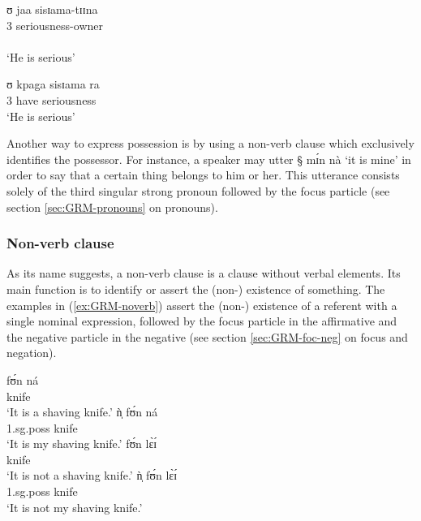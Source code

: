 \begin{exe}
\ex\label{ex:GRM-poss-owner}
\begin{xlist}
 \ex\label{ex:GRM-poss-owner-exist}
\glll ʊ jaa sisɪama-tɪɪna\\
{3\sg} {\ident} seriousness-owner\\
  {\psor} {}   {\psed} \\
\glt `He is serious'

 \ex\label{ex:GRM-poss-owner-have}
\gll ʊ kpaga sisɪama ra\\
{3\sg} have {seriousness} {\foc}\\
\glt `He is serious'
\end{xlist}
\end{exe}

Another way to express possession is by using a non-verb clause which
  exclusively identifies   the possessor. For instance, a speaker may utter {\S
mɪ́n nà} `it is
mine' in order to say that a
certain thing belongs to him or her. This utterance consists solely of the third
singular strong pronoun followed by
the focus particle (see section \ref{sec:GRM-pronouns} on pronouns).


\subsubsection{Non-verb clause}
\label{sec:GRM-noverb}

As its name suggests, a non-verb clause is a clause without verbal elements. 
Its
main function is to identify or assert the (non-) existence of 
something.  The examples in (\ref{ex:GRM-noverb}) assert the (non-) existence
of a
referent with a single nominal expression, followed by the focus particle in
the affirmative and the negative particle in the negative (see section
\ref{sec:GRM-foc-neg} on focus and negation). 



\begin{exe}
\ex\label{ex:GRM-noverb}

\begin{xlist}
\begin{multicols}{2}
 \ex\label{ex:GRM-noverb-aff-1}
\gll fʊ́n ná\\
knife {\foc}\\
\glt `It is a shaving knife.'
 \ex\label{ex:GRM-noverb-aff-poss}
\gll ǹ̩ fʊ́n ná\\
{\sc 1.sg.poss} knife {\foc}\\
 \glt `It is my shaving knife.'
 \ex\label{ex:GRM-noverb-neg-1}
\gll fʊ́n lɛ̀ɪ́\\
knife {\neg}\\
 \glt `It is not a shaving knife.'
 \ex\label{ex:GRM-noverb-neg-poss}
\gll ǹ̩  fʊ́n lɛ̀ɪ́\\
{\sc 1.sg.poss} knife {\neg}\\
 \glt `It is not my shaving knife.'
\end{multicols}
\end{xlist}
\end{exe}


